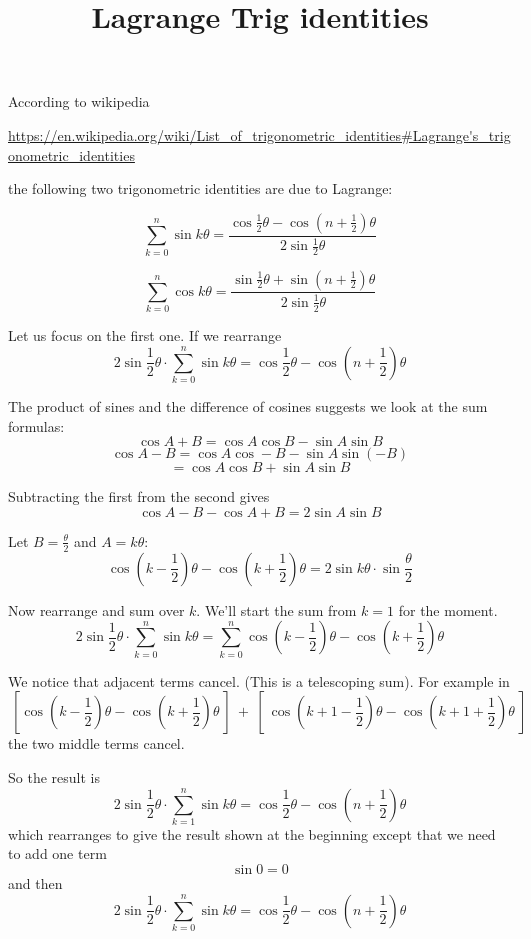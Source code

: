 \documentclass[11pt, oneside]{article}
\title{Lagrange Trig identities}
\date{}
\begin{document}
\maketitle
\Large


According to wikipedia

\url{https://en.wikipedia.org/wiki/List_of_trigonometric_identities#Lagrange's_trigonometric_identities}

the following two trigonometric identities are due to Lagrange:

\[ \sum_{k=0}^n \sin k \theta = \frac {\cos {\frac 1 2} \theta - \cos (n + {\frac 1 2}) \theta} {2 \sin {\frac 1 2} \theta} \]

\[ \sum_{k=0}^n \cos k \theta = \frac {\sin {\frac 1 2} \theta + \sin (n + {\frac 1 2}) \theta} {2 \sin {\frac 1 2} \theta} \]

Let us focus on the first one.  If we rearrange
\[ 2 \sin {\frac 1 2} \theta \cdot \sum_{k=0}^n \sin k \theta =  \cos {\frac 1 2} \theta - \cos (n + {\frac 1 2}) \theta  \]

The product of sines and the difference of cosines suggests we look at the sum formulas:
\[ \cos A + B = \cos A \cos B - \sin A \sin B \]
\[ \cos A - B = \cos A \cos -B - \sin A \sin (- B) \]
\[ = \cos A \cos B + \sin A \sin B \]

Subtracting the first from the second gives
\[ \cos A - B - \cos A + B = 2 \sin A \sin B \]

Let $B = {\frac \theta 2}$ and $A = k \theta$:
\[ \cos (k -  {\frac 1 2}) \theta  - \cos (k +  {\frac 1 2}) \theta = 2 \sin k \theta \cdot  \sin {\frac \theta 2} \]

Now rearrange and sum over $k$.  We'll start the sum from $k=1$ for the moment.
\[ 2 \sin {\frac 1 2} \theta  \cdot \sum_{k=0}^n \sin k \theta = \sum_{k=0}^n  \cos (k -  {\frac 1 2}) \theta  - \cos (k +  {\frac 1 2}) \theta \]

We notice that adjacent terms cancel.  (This is a telescoping sum).  For example in
\[ \ [ \cos (k -  {\frac 1 2}) \theta  - \cos (k +  {\frac 1 2}) \theta \ ] \ + \ [ \ \cos (k + 1 -  {\frac 1 2}) \theta  - \cos (k + 1 +  {\frac 1 2}) \theta \ ] \]
the two middle terms cancel.  

So the result is
\[ 2 \sin {\frac 1 2} \theta  \cdot \sum_{k=1}^n \sin k \theta = \cos {\frac 1 2} \theta  - \cos (n +  {\frac 1 2}) \theta \]
which rearranges to give the result shown at the beginning except that we need to add one term
\[ \sin 0 = 0 \] 
and then
\[ 2 \sin {\frac 1 2} \theta  \cdot \sum_{k=0}^n \sin k \theta = \cos {\frac 1 2} \theta  - \cos (n +  {\frac 1 2}) \theta \]
\end{document}
